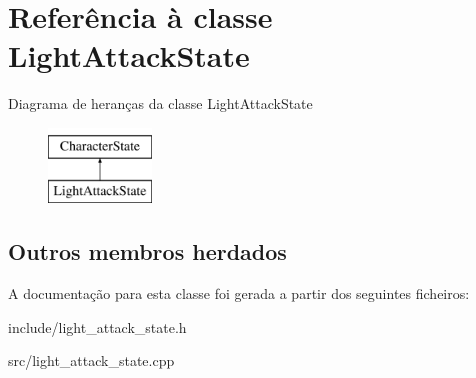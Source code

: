 \hypertarget{classLightAttackState}{}\section{Referência à classe Light\+Attack\+State}
\label{classLightAttackState}
Diagrama de heranças da classe Light\+Attack\+State\begin{figure}[H]
\begin{center}
\leavevmode
\includegraphics[height=2.000000cm]{classLightAttackState}
\end{center}
\end{figure}
\subsection*{Outros membros herdados}


A documentação para esta classe foi gerada a partir dos seguintes ficheiros\+:\begin{DoxyCompactItemize}
\item 
include/light\+\_\+attack\+\_\+state.\+h\item 
src/light\+\_\+attack\+\_\+state.\+cpp\end{DoxyCompactItemize}
